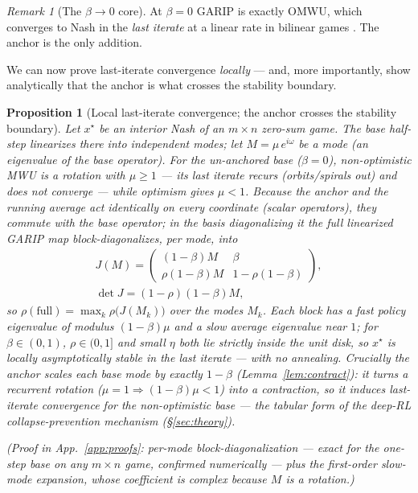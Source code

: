 \documentclass[10pt,twocolumn]{article}
\theoremstyle{plain}
\newtheorem{proposition}{Proposition}
\theoremstyle{remark}
\newtheorem{remark}{Remark}
\begin{document}
\begin{remark}[The $\beta\!\to\!0$ core]
\label{rem:omwu}
At $\beta=0$ GARIP is exactly OMWU, which converges to Nash in the \emph{last
iterate} at a linear rate in bilinear games \cite{wei2021linear,daskalakis2018optimistic}.
The anchor is the only addition.
\end{remark}

We can now prove last-iterate convergence \emph{locally} --- and, more importantly,
show analytically that the anchor is what crosses the stability boundary.

\begin{proposition}[Local last-iterate convergence; the anchor crosses the
stability boundary]
\label{prop:localli}
Let $x^\star$ be an interior Nash of an $m\times n$ zero-sum game. The base half-step
linearizes there into independent modes; let $M=\mu\,e^{i\omega}$ be a mode (an
eigenvalue of the base operator). For the un-anchored base ($\beta\!=\!0$),
non-optimistic MWU is a rotation with $\mu\ge1$ --- its last iterate recurs
(orbits/spirals out) and does \emph{not} converge --- while optimism gives $\mu<1$.
Because the anchor and the running average act \emph{identically on every coordinate}
(scalar operators), they commute with the base operator; in the basis diagonalizing
it the full linearized GARIP map block-diagonalizes, per mode, into
\[
\begin{gathered}
J(M)=\begin{pmatrix}(1-\beta)M & \beta\\[1pt] \rho(1-\beta)M & 1-\rho(1-\beta)\end{pmatrix},\\[3pt]
\det J=(1-\rho)(1-\beta)M,
\end{gathered}
\]
so $\rho(\text{full})=\max_k\rho\big(J(M_k)\big)$ over the modes $M_k$. Each block has a
\emph{fast} policy eigenvalue of modulus $(1-\beta)\mu$ and a \emph{slow} average
eigenvalue near $1$; for $\beta\in(0,1)$, $\rho\in(0,1]$ and small $\eta$ both lie
strictly inside the unit disk, so $x^\star$ is locally asymptotically stable in the
last iterate --- with \emph{no annealing}. Crucially the anchor scales each base mode
by exactly $1-\beta$ (Lemma~\ref{lem:contract}): it turns a recurrent rotation
($\mu\!=\!1\Rightarrow(1-\beta)\mu<1$) into a contraction, so it \emph{induces}
last-iterate convergence for the non-optimistic base --- the tabular form of the
deep-RL collapse-prevention mechanism (\S\ref{sec:theory}).
\end{proposition}
\noindent\emph{(Proof in App.~\ref{app:proofs}: per-mode block-diagonalization ---
exact for the one-step base on any $m\times n$ game, confirmed numerically --- plus the
first-order slow-mode expansion, whose coefficient is complex because $M$ is a
rotation.)}
\end{document}

